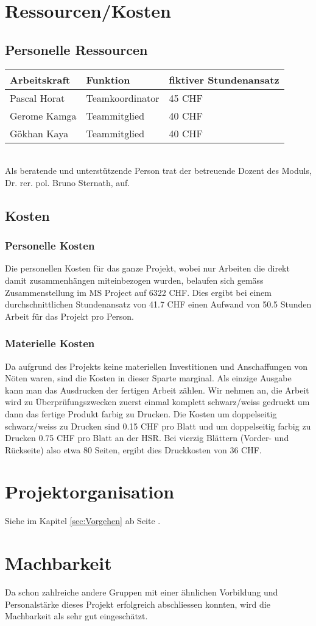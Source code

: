 \section{Ressourcen/Kosten}
\subsection{Personelle Ressourcen}
\begin{tabular}{| p{3cm} | p{4cm} | p{5cm} |}
\hline
\textbf{Arbeitskraft} & \textbf{Funktion} & \textbf{fiktiver Stundenansatz} \\ \hline
Pascal Horat & Teamkoordinator & 45 CHF \\ \hline
Gerome Kamga & Teammitglied & 40 CHF \\ \hline
Gökhan Kaya & Teammitglied & 40 CHF \\ \hline

\end{tabular}\\

Als beratende und unterstützende Person trat der betreuende Dozent des Moduls, Dr. rer. pol. Bruno Sternath, auf.

\subsection{Kosten}
\subsubsection{Personelle Kosten}
Die personellen Kosten für das ganze Projekt, wobei nur Arbeiten die direkt damit zusammenhängen miteinbezogen wurden, belaufen sich gemäss Zusammenstellung im MS Project auf 6322 CHF. Dies ergibt bei einem durchschnittlichen Stundenansatz von 41.7 CHF einen Aufwand von 50.5 Stunden Arbeit für das Projekt pro Person.

\subsubsection{Materielle Kosten}
Da aufgrund des Projekts keine materiellen Investitionen und Anschaffungen von Nöten waren, sind die Kosten in dieser Sparte marginal. Als einzige Ausgabe kann man das Ausdrucken der fertigen Arbeit zählen. Wir nehmen an, die Arbeit wird zu Überprüfungszwecken zuerst einmal komplett schwarz/weiss gedruckt um dann das fertige Produkt farbig zu Drucken. Die Kosten um doppelseitig schwarz/weiss zu Drucken sind 0.15 CHF pro Blatt und um doppelseitig farbig zu Drucken 0.75 CHF pro Blatt an der HSR. Bei vierzig Blättern (Vorder- und Rückseite) also etwa 80 Seiten, ergibt dies Druckkosten von 36 CHF.
\section{Projektorganisation}
Siehe im Kapitel \ref{sec:Vorgehen} ab Seite \pageref{sec:Vorgehen}.
\section{Machbarkeit}
Da schon zahlreiche andere Gruppen mit einer ähnlichen Vorbildung und Personalstärke dieses Projekt erfolgreich abschliessen konnten, wird die Machbarkeit als sehr gut eingeschätzt.